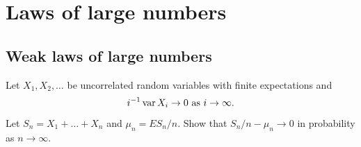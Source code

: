 \documentclass[a4paper]{article}
\author{\nauthor\vspace{5pt}\\
Carnegie Mellon University}
\begin{document}
\maketitle

\tableofcontents

\setcounter{section}{1}

\section{Laws of large numbers}

\setcounter{subsection}{1}

\subsection{Weak laws of large numbers}

\begin{ex}[Durrett 2.2.1]
  Let $X_1, X_2, \dots$ be uncorrelated random variables with
  finite expectations and
  \[
    i^{-1} \operatorname{var} X_i \to 0 \text{ as $i \to \infty$}.
  \]
  Let $S_n = X_1 + \dots + X_n$ and $\mu_n = E S_n / n$. Show that
  $S_n / n - \mu_n \to 0$ in probability as $n \to \infty$.
\end{ex}
\end{document}
